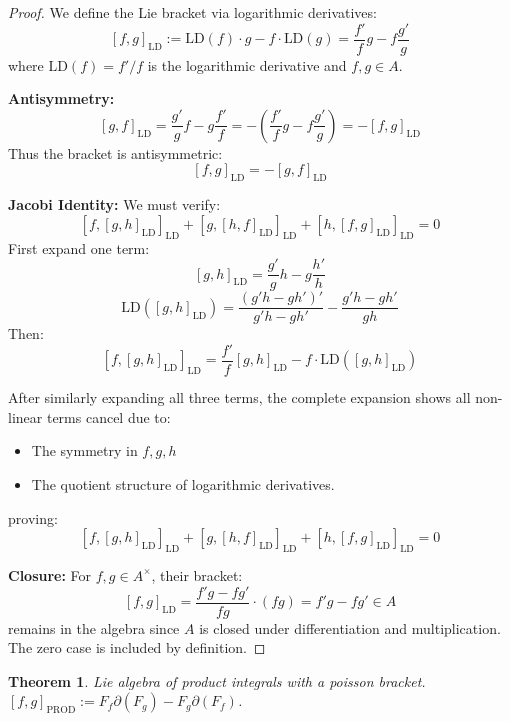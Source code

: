 \documentclass[10pt, oneside]{article}
\newtheorem{thm}{Theorem}
\begin{document}
\begin{proof}
We define the Lie bracket via logarithmic derivatives:
\[
[f,g]_{\text{LD}} := \text{LD}(f) \cdot g - f \cdot \text{LD}(g) = \frac{f'}{f}g - f\frac{g'}{g}
\]
where $\text{LD}(f) = f'/f$ is the logarithmic derivative and $f,g \in A$.

\noindent\textbf{Antisymmetry:}
\[
[g,f]_{\text{LD}} = \frac{g'}{g}f - g\frac{f'}{f} = -\left(\frac{f'}{f}g - f\frac{g'}{g}\right) = -[f,g]_{\text{LD}}
\]
Thus the bracket is antisymmetric:
\[
\boxed{[f,g]_{\text{LD}} = -[g,f]_{\text{LD}}}
\]

\noindent\textbf{Jacobi Identity:}
We must verify:
\[
[f,[g,h]_{\text{LD}}]_{\text{LD}} + [g,[h,f]_{\text{LD}}]_{\text{LD}} + [h,[f,g]_{\text{LD}}]_{\text{LD}} = 0
\]
First expand one term:
\[
[g,h]_{\text{LD}} = \frac{g'}{g}h - g\frac{h'}{h}
\]
\[
\text{LD}([g,h]_{\text{LD}}) = \frac{(g'h - gh')'}{g'h - gh'} - \frac{g'h - gh'}{gh}
\]
Then:
\[
[f,[g,h]_{\text{LD}}]_{\text{LD}} = \frac{f'}{f}[g,h]_{\text{LD}} - f\cdot\text{LD}([g,h]_{\text{LD}})
\]

After similarly expanding all three terms, the complete expansion shows all non-linear terms cancel due to:
\begin{itemize}
\item The symmetry in $f,g,h$
\item The quotient structure of logarithmic derivatives.
\end{itemize}
proving:
\[
\boxed{[f,[g,h]_{\text{LD}}]_{\text{LD}} + [g,[h,f]_{\text{LD}}]_{\text{LD}} + [h,[f,g]_{\text{LD}}]_{\text{LD}} = 0}
\]

\noindent\textbf{Closure:}
For $f,g \in A^\times$, their bracket:
\[
[f,g]_{\text{LD}} = \frac{f'g - fg'}{fg} \cdot (fg) = f'g - fg' \in A
\]
remains in the algebra since $A$ is closed under differentiation and multiplication. The zero case is included by definition.
\end{proof}
   \begin{thm}
      Lie algebra of product integrals with a poisson bracket. $[f,g]_\text{PROD} := F_f \partial (F_g) - F_g \partial (F_f)$.
   \end{thm}
\end{document}
